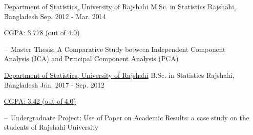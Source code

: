 

\begin{cventries}

  \cventry
    {\href{http://www.ru.ac.bd/}{Department of Statistics, University of Rajshahi}} %
    {{M.Sc. in Statistics} }%
    {Rajshahi, Bangladesh} %
    {Sep. 2012 - Mar. 2014} %
    {
      \begin{cvitems} %
        \item {\href{https://www.dropbox.com/sh/uevgjhbdw4s3p0f/AADg7rfgtQhqd2HWNrjShm5Pa?dl=0}{CGPA: 3.778 (out of 4.0)}}
        \item {--\
	Master Thesis: A Comparative Study between Independent Component Analysis (ICA) and Principal Component Analysis (PCA)}
      \end{cvitems}
    }
  \cventry
    {\href{http://www.ru.ac.bd/}{Department of Statistics, University of Rajshahi}}  %
    {B.Sc. in Statistics} %
    {Rajshahi, Bangladesh} %
    {Jan. 2017 - Sep. 2012} %
    {
      \begin{cvitems} %
        \item {\href{https://www.dropbox.com/sh/3jqu1c1w4nyywll/AAC8BlJYWu6u3BTf0fJJpOmla?dl=0}{CGPA: 3.42 (out of 4.0)}}
        \item {--\
	Undergraduate Project: Use of Paper on Academic Results: a case study on the students of Rajshahi University}
      \end{cvitems}
    }

\end{cventries}
